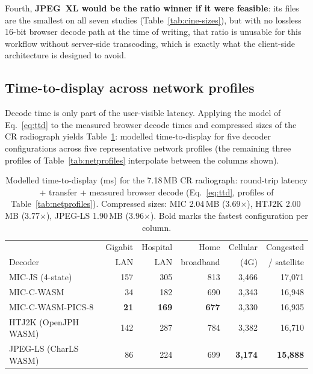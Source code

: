 \documentclass[journal]{IEEEtran}
\begin{document}
Fourth, \textbf{JPEG~XL would be the ratio winner if it were feasible}:
its files are the smallest on all seven studies (Table~\ref{tab:cine-sizes}),
but with no lossless 16-bit browser decode path at the time of writing, that
ratio is unusable for this workflow without server-side transcoding, which
is exactly what the client-side architecture is designed to avoid.

\subsection{Time-to-display across network profiles}
\label{sec:ttd}

Decode time is only part of the user-visible latency. Applying the model of
Eq.~\eqref{eq:ttd} to the measured browser decode times and compressed sizes
of the CR radiograph yields Table~\ref{tab:ttd}: modelled time-to-display
for five decoder configurations across five representative network profiles
(the remaining three profiles of Table~\ref{tab:netprofiles} interpolate
between the columns shown).

\begin{table}[htbp]
\centering
\caption{Modelled time-to-display (ms) for the 7.18\,MB CR radiograph:
round-trip latency + transfer + measured browser decode
(Eq.~\eqref{eq:ttd}, profiles of Table~\ref{tab:netprofiles}). Compressed
sizes: MIC 2.04\,MB (3.69$\times$), HTJ2K 2.00\,MB (3.77$\times$), JPEG-LS
1.90\,MB (3.96$\times$). Bold marks the fastest configuration per column.}
\label{tab:ttd}
\scriptsize
\setlength{\tabcolsep}{3pt}
\begin{tabular}{lrrrrr}
\toprule
 & Gigabit & Hospital & Home & Cellular & Congested \\
Decoder & LAN & LAN & broadband & (4G) & / satellite \\
\midrule
MIC-JS (4-state)      & 157 & 305 & 813 & 3{,}466 & 17{,}071 \\
MIC-C-WASM            & 34  & 182 & 690 & 3{,}343 & 16{,}948 \\
MIC-C-WASM-PICS-8     & \textbf{21} & \textbf{169} & \textbf{677} & 3{,}330 & 16{,}935 \\
HTJ2K (OpenJPH WASM)  & 142 & 287 & 784 & 3{,}382 & 16{,}710 \\
JPEG-LS (CharLS WASM) & 86  & 224 & 699 & \textbf{3{,}174} & \textbf{15{,}888} \\
\bottomrule
\end{tabular}
\end{table}
\end{document}
